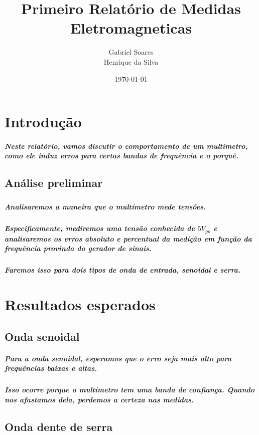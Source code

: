 \documentclass[12pt,twoside, a4paper, twocolumn]{article}
\title{Primeiro Relatório de Medidas Eletromagneticas}
\author{Gabriel Soares \\ Henrique da Silva}
\date{\today}
\begin{document}
\maketitle
{}
\newpage
\tableofcontents
\newpage



\section{Introdução}


\subparagraph*{Neste relatório, vamos discutir o comportamento de um multímetro, como ele induz erros para certas bandas de frequência e o porquê.}





\subsection{Análise preliminar}
\subparagraph*{}


\subparagraph*{Analisaremos a maneira que o multímetro mede tensões.}

\subparagraph*{Especificamente, mediremos uma tensão conhecida de $5 V_{pp}$ e analisaremos os erros absoluto e percentual da medição em função da frequência provinda do gerador de sinais.}

\subparagraph*{Faremos isso para dois tipos de onda de entrada, senoidal e serra.}

\section{Resultados esperados}

\subsection{Onda senoidal}

\subparagraph*{Para a onda senoidal, esperamos que o erro seja mais alto para frequências baixas e altas.}

\subparagraph*{Isso ocorre porque o multímetro tem uma banda de confiança. Quando nos afastamos dela, perdemos a certeza nas medidas.}

\subsection{Onda dente de serra}
\end{document}
